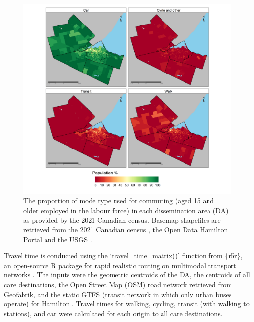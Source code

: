 \documentclass[
  super,
  preprint,
  3p]{elsarticle}
\begin{document}
\begin{figure}

{\centering \includegraphics[width=6.25in,height=\textheight]{figures/Fig4-plot_modal_splits.png}

}

\caption{\label{fig-Fig4}The proportion of mode type used for commuting
(aged 15 and older employed in the labour force) in each dissemination
area (DA) as provided by the 2021 Canadian census. Basemap shapefiles
are retrieved from the 2021 Canadian census
\citep{governmentofcanadaCensusPopulation2023}, the Open Data Hamilton
Portal \citep{opendatahamiltonCityBoundary2023} and the USGS
\citep{greatlakesUSGS2010}.}

\end{figure}

Travel time is conducted using the `travel\_time\_matrix()' function
from \{r5r\}, an open-source R package for rapid realistic routing on
multimodal transport networks \citep{pereiraR5rRapidRealistic2021}. The
inputs were the geometric centroids of the DA, the centroids of all care
destinations, the Open Street Map (OSM) road network retrieved from
Geofabrik, \citep{geofrabrikOntarioCanadaOpen2023} and the static GTFS
(transit network in which only urban buses operate) for Hamilton
\citep{transitfeedsHamiltonStreetRailway2023}. Travel times for walking,
cycling, transit (with walking to stations), and car were calculated for
each origin to all care destinations.
\end{document}
